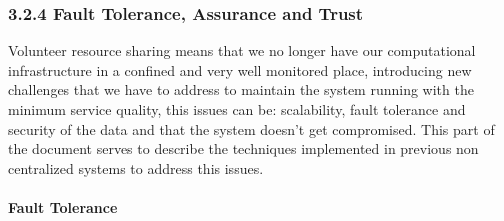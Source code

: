 \documentclass{./llncs2e/llncs}
\begin{document}








\subsubsection{3.2.4 Fault Tolerance, Assurance and Trust}

Volunteer resource sharing means that we no longer have our computational infrastructure in a confined and very well monitored place, introducing new challenges that we have to address \cite{Koloniari2005} to maintain the system running with the minimum service quality, this issues can be: scalability, fault tolerance and security\cite{Wallach} of the data and that the system doesn't get compromised. This part of the document serves to describe the techniques implemented in previous non centralized systems to address this issues.

\paragraph{Fault Tolerance} %
\label{par:Fault Tolerance}
\end{document}
